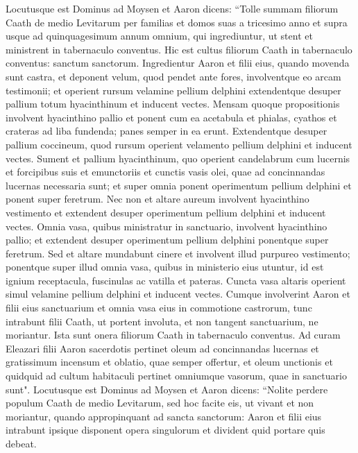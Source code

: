 \begin{biblechapter}  
\verse Locutusque est Dominus ad Moysen et Aaron dicens: 
\verse “Tolle summam filiorum Caath de medio Levitarum per familias et domos suas 
\verse a tricesimo anno et supra usque ad quinquagesimum annum omnium, qui ingrediuntur, ut stent et ministrent in tabernaculo conventus. 
\verse Hic est cultus filiorum Caath in tabernaculo conventus: sanctum sanctorum. 
\verse Ingredientur Aaron et filii eius, quando movenda sunt castra, et deponent velum, quod pendet ante fores, involventque eo arcam testimonii; 
\verse et operient rursum velamine pellium delphini extendentque desuper pallium totum hyacinthinum et inducent vectes.  
\verse Mensam quoque propositionis involvent hyacinthino pallio et ponent cum ea acetabula et phialas, cyathos et crateras ad liba fundenda; panes semper in ea erunt. 
\verse Extendentque desuper pallium coccineum, quod rursum operient velamento pellium delphini et inducent vectes. 
\verse Sument et pallium hyacinthinum, quo operient candelabrum cum lucernis et forcipibus suis et emunctoriis et cunctis vasis olei, quae ad concinnandas lucernas necessaria sunt; 
\verse et super omnia ponent operimentum pellium delphini et ponent super feretrum. 
\verse Nec non et altare aureum involvent hyacinthino vestimento et extendent desuper operimentum pellium delphini et inducent vectes. 
\verse Omnia vasa, quibus ministratur in sanctuario, involvent hyacinthino pallio; et extendent desuper operimentum pellium delphini ponentque super feretrum. 
\verse Sed et altare mundabunt cinere et involvent illud purpureo vestimento; 
\verse ponentque super illud omnia vasa, quibus in ministerio eius utuntur, id est ignium receptacula, fuscinulas ac vatilla et pateras. Cuncta vasa altaris operient simul velamine pellium delphini et inducent vectes. 
\verse Cumque involverint Aaron et filii eius sanctuarium et omnia vasa eius in commotione castrorum, tunc intrabunt filii Caath, ut portent involuta, et non tangent sanctuarium, ne moriantur. Ista sunt onera filiorum Caath in tabernaculo conventus. 
\verse Ad curam Eleazari filii Aaron sacerdotis pertinet oleum ad concinnandas lucernas et gratissimum incensum et oblatio, quae semper offertur, et oleum unctionis et quidquid ad cultum habitaculi pertinet omniumque vasorum, quae in sanctuario sunt". 
\verse Locutusque est Dominus ad Moysen et Aaron dicens: 
\verse “Nolite perdere populum Caath de medio Levitarum, 
\verse sed hoc facite eis, ut vivant et non moriantur, quando appropinquant ad sancta sanctorum: Aaron et filii eius intrabunt ipsique disponent opera singulorum et divident quid portare quis debeat. 

\end{biblechapter}
